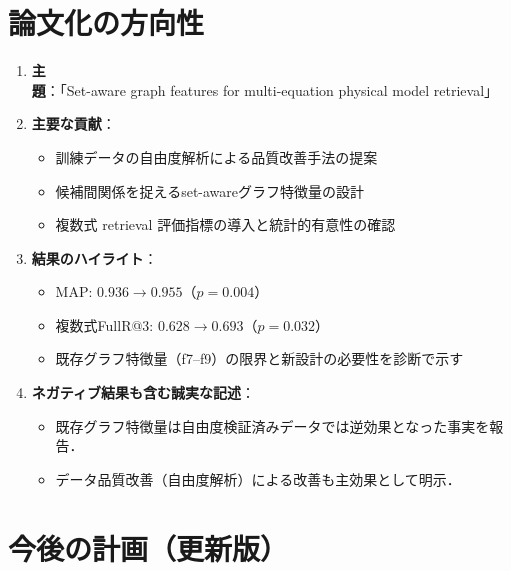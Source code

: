 \documentclass[11pt,a4paper]{ltjsarticle}
\begin{document}
\section{論文化の方向性}

\begin{enumerate}[leftmargin=2em, nosep]
  \item \textbf{主題}：「Set-aware graph features for multi-equation physical model retrieval」
  \item \textbf{主要な貢献}：
    \begin{itemize}[nosep]
      \item 訓練データの自由度解析による品質改善手法の提案
      \item 候補間関係を捉えるset-awareグラフ特徴量の設計
      \item 複数式 retrieval 評価指標の導入と統計的有意性の確認
    \end{itemize}
  \item \textbf{結果のハイライト}：
    \begin{itemize}[nosep]
      \item MAP: $0.936 \to 0.955$（$p = 0.004$）
      \item 複数式FullR@3: $0.628 \to 0.693$（$p = 0.032$）
      \item 既存グラフ特徴量（f7--f9）の限界と新設計の必要性を診断で示す
    \end{itemize}
  \item \textbf{ネガティブ結果も含む誠実な記述}：
    \begin{itemize}[nosep]
      \item 既存グラフ特徴量は自由度検証済みデータでは逆効果となった事実を報告．
      \item データ品質改善（自由度解析）による改善も主効果として明示．
    \end{itemize}
\end{enumerate}

\section{今後の計画（更新版）}
\end{document}
